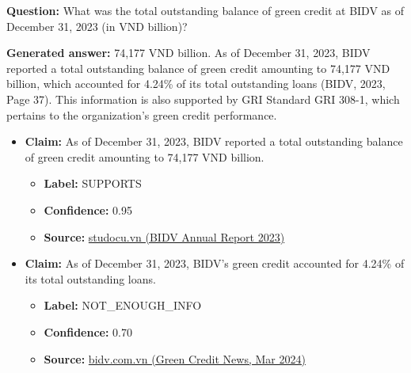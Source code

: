 \documentclass[sn-mathphys, oneside]{sn-jnl}
\begin{document}
\begin{tcolorbox}[colback=white,colframe=black!65,boxrule=0.6pt,arc=0pt,left=8pt,right=8pt,top=8pt,bottom=8pt]

\textbf{Question:} What was the total outstanding balance of green credit at BIDV as of December 31, 2023 (in VND billion)?

\textbf{Generated answer:} 74,177 VND billion. As of December 31, 2023, BIDV reported a total outstanding balance of green credit amounting to 74,177 VND billion, which accounted for 4.24\% of its total outstanding loans (BIDV, 2023, Page 37). This information is also supported by GRI Standard GRI 308-1, which pertains to the organization's green credit performance.

\begin{itemize}
    \item \textbf{Claim:} As of December 31, 2023, BIDV reported a total outstanding balance of green credit amounting to 74,177 VND billion.
    \begin{itemize}
        \item \textbf{Label:} SUPPORTS
        \item \textbf{Confidence:} 0.95
        \item \textbf{Source:} \href{https://www.studocu.vn/vn/document/hoc-vien-tai-chinh/tai-chinh-tien-te/bidv-annual-report-2023-fn-da-nen-da-nen-1/108663677}{studocu.vn (BIDV Annual Report 2023)}
    \end{itemize}

    \item \textbf{Claim:} As of December 31, 2023, BIDV's green credit accounted for 4.24\% of its total outstanding loans.
    \begin{itemize}
        \item \textbf{Label:} NOT\_ENOUGH\_INFO
        \item \textbf{Confidence:} 0.70
        \item \textbf{Source:} \href{https://bidv.com.vn/bidv_en/tin-tuc/tin-ve-bidv/bidv-danh-10000-ty-dong-tai-tro-cac-du-an-cong-trinh-xanh}{bidv.com.vn (Green Credit News, Mar 2024)}
    \end{itemize}
\end{itemize}

\end{tcolorbox}
\end{document}
